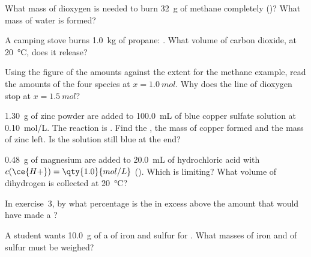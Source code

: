 \begin{exercise}[$\star\star$]\label{exo:g10:reaction-progress-table:6}
What mass of dioxygen is needed to burn \qty{32}{g} of methane completely
()? What mass of water is formed?
\end{exercise}

\begin{exercise}[$\star\star$]\label{exo:g10:reaction-progress-table:7}
A camping stove burns \qty{1.0}{kg} of propane:
. What volume of carbon dioxide, at
\qty{20}{\celsius}, does it release?
\end{exercise}

\begin{exercise}[$\star\star$]\label{exo:g10:reaction-progress-table:8}
Using the figure of the amounts against the extent for the methane
example, read the amounts of the four species at $x = \qty{1.0}{mol}$.
Why does the line of dioxygen stop at $x = \qty{1.5}{mol}$?
\end{exercise}

\begin{exercise}[$\star\star$]\label{exo:g10:reaction-progress-table:9}
\qty{1.30}{g} of zinc powder are added to \qty{100.0}{mL} of blue copper
sulfate solution at \qty{0.10}{mol/L}. The reaction is
.
Find the , the mass of copper formed and the mass of
zinc left. Is the solution still blue at the end?
\end{exercise}

\begin{exercise}[$\star\star$]\label{exo:g10:reaction-progress-table:10}
\qty{0.48}{g} of magnesium are added to \qty{20.0}{mL} of hydrochloric
acid with $c(\ce{H+}) = \qty{1.0}{mol/L}$
(). Which  is limiting? What volume
of dihydrogen is collected at \qty{20}{\celsius}?
\end{exercise}

\begin{exercise}[$\star\star$]\label{exo:g10:reaction-progress-table:11}
In exercise~3, by what percentage is the  in excess above the
amount that would have made a ?
\end{exercise}

\begin{exercise}[$\star\star\star$]\label{exo:g10:reaction-progress-table:12}
A student wants \qty{10.0}{g} of a  of iron and
sulfur for . What masses of iron and of sulfur must be
weighed?
\end{exercise}

